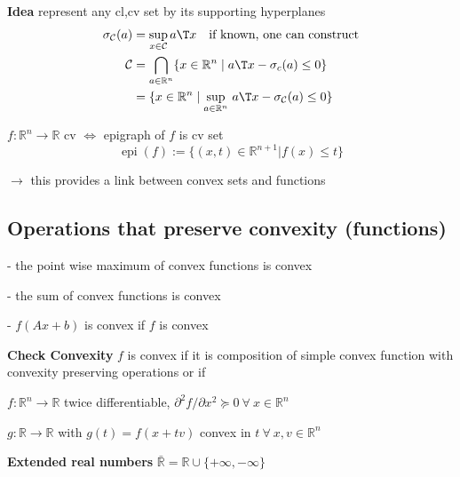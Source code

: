 \textbf{Idea} represent any cl,cv set by its supporting hyperplanes
\vspace{-2mm}
\[\begin{aligned}
		\sigma_\mathcal{C}(a) & = \sup_{x \in \mathcal{C}}a\T x
		\quad\text{if known, one can construct}                                                                                                        \\
		\mathcal{C}           & = \bigcap_{a \in \mathbb{R}^n} \{x \in \mathbb{R}^n \mid a\T x - \sigma_c(a) \leq 0\}                                  \\
		                      & = \{x \in \mathbb{R}^n \mid \underset{a \in \mathbb{R}^{n}}{\operatorname{sup}}\ a\T x - \sigma_\mathcal{C}(a) \le 0\}
	\end{aligned}\]
\vspace{-2mm}

\begin{definition}
	\vspace{-2mm}
	$f:\mathbb{R}^n \rightarrow \mathbb{R}$ cv
	$\Leftrightarrow$
	epigraph of $f$ is cv set
	$$\operatorname{epi}(f):=\{(x,t)\in \mathbb{R}^{n+1} | f(x)\le t\}$$
\end{definition}
\vspace{-2mm}

$\rightarrow$ this provides a link between convex sets and functions

\subsection{Operations that preserve convexity (functions)}

- the point wise maximum of convex functions is convex

- the sum of convex functions is convex

- $f(Ax+b)$ is convex if $f$ is convex

\textbf{Check Convexity} $f$ is convex if it is
composition of simple convex function
with convexity preserving operations
or if

$f: \mathbb{R}^n \rightarrow \mathbb{R}$ twice differentiable,
$\partial^2f/\partial x^2 \succeq 0\ \forall\ x \in \mathbb{R}^{n}$

$g: \mathbb{R} \rightarrow \mathbb{R}$ with $g(t)=f(x+tv)$
convex in $t\ \forall\ x,v \in \mathbb{R}^{n}$



\textbf{Extended real numbers} $\bar{\mathbb{R}} = \mathbb{R} \cup \{+\infty, -\infty\}$


